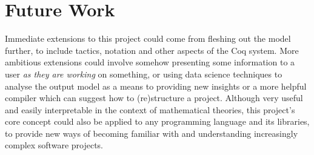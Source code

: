 \section{Future Work}

Immediate extensions to this project could come from fleshing out the model
further, to include tactics, notation and other aspects of the Coq system.  More
ambitious extensions could involve somehow presenting some information to a user
\emph{as they are working} on something, or using data science techniques to
analyse the output model as a means to providing new insights or a more helpful
compiler which can suggest how to (re)structure a project.  Although very useful
and easily interpretable in the context of mathematical theories, this project's
core concept could also be applied to any programming language and its
libraries, to provide new ways of becoming familiar with and understanding
increasingly complex software projects.
